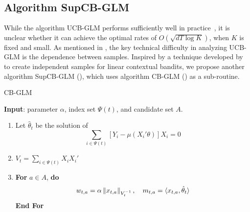 \subsection{Algorithm SupCB-GLM}

While the algorithm UCB-GLM performs sufficiently well in practice~\cite{liunbiased},  it is unclear whether it can achieve the optimal rates of ${O}(\sqrt{dT\log K})$, when $K$ is fixed and small. As mentioned in , the key technical difficulty in analyzing UCB-GLM is the dependence between samples. Inspired by a technique developed by \citet{auer2003using} to create independent samples for linear contextual bandits, we propose another algorithm SupCB-GLM (), which uses algorithm CB-GLM () as a sub-routine.


\begin{algorithm}
\caption{CB-GLM} \label{alg: CB} \vspace{0.05in}
\textbf{Input}: parameter $\alpha$, index set $\Psi(t)$, and candidate set $A$. \vspace{-0.1in}
\begin{enumerate}
\item  Let $\hat{\theta}_t$ be the solution of
$$\sum_{i \in \Psi(t)} \left[Y_i - \mu(X_i'\theta)\right]X_i = 0$$
\item $ V_t=\sum_{i \in \Psi(t)} X_i X_i'$
\item \textbf{For} {$a \in A$}, \textbf{do}
 $$ w_{t,a} = \alpha \left\|x_{t,a}\right\|_{V_t^{-1}}, \quad m_{t,a} =  \langle x_{t,a}, \hat{\theta}_t \rangle$$
\textbf{End For}
\end{enumerate}
\end{algorithm}


